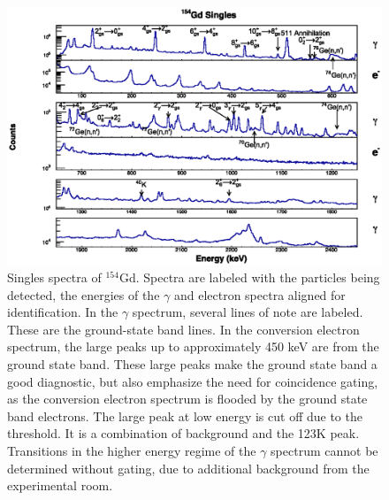 \begin{figure}[!]
    \centering
    \includegraphics[scale=0.9]{154GdTablesAndFigs/154Gd_Singles_Label.eps}
    \caption{Singles spectra of $^{154}$Gd. Spectra are labeled with the particles being detected, the energies of the $\gamma$ and electron spectra aligned for identification. In the $\gamma$ spectrum, several lines of note are labeled. These are the ground-state band lines. In the conversion electron spectrum, the large peaks up to approximately 450 keV are from the ground state band. These large peaks make the ground state band a good diagnostic, but also emphasize the need for coincidence gating, as the conversion electron spectrum is flooded by the ground state band electrons. The large peak at low energy is cut off due to the threshold. It is a combination of background and the 123K peak. Transitions in the higher energy regime of the $\gamma$ spectrum cannot be determined without gating, due to additional background from the experimental room.}
    \label{fig:154Gd_Singles}
\end{figure}